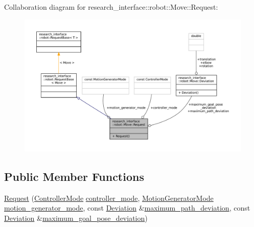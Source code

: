 Collaboration diagram for research\+\_\+interface\+:\+:robot\+:\+:Move\+:\+:Request\+:
\nopagebreak
\begin{figure}[H]
\begin{center}
\leavevmode
\includegraphics[width=350pt]{structresearch__interface_1_1robot_1_1Move_1_1Request__coll__graph}
\end{center}
\end{figure}
\subsection*{Public Member Functions}
\begin{DoxyCompactItemize}
\item 
\hyperlink{structresearch__interface_1_1robot_1_1Move_1_1Request_a763f469d46e3c7b3c74e67995d1974f5}{Request} (\hyperlink{structresearch__interface_1_1robot_1_1Move_a3e7b80b30bbf01dc902c84402502ebbc}{Controller\+Mode} \hyperlink{structresearch__interface_1_1robot_1_1Move_1_1Request_abdc9f396518796f92f722ba1d6d50861}{controller\+\_\+mode}, \hyperlink{structresearch__interface_1_1robot_1_1Move_a334b8380507154e8042b57fbd3287c0f}{Motion\+Generator\+Mode} \hyperlink{structresearch__interface_1_1robot_1_1Move_1_1Request_a550736be5350d0987a133557a8757fd5}{motion\+\_\+generator\+\_\+mode}, const \hyperlink{structresearch__interface_1_1robot_1_1Move_1_1Deviation}{Deviation} \&\hyperlink{structresearch__interface_1_1robot_1_1Move_1_1Request_ace5bcd09768e2cba8ba1e4833d61927d}{maximum\+\_\+path\+\_\+deviation}, const \hyperlink{structresearch__interface_1_1robot_1_1Move_1_1Deviation}{Deviation} \&\hyperlink{structresearch__interface_1_1robot_1_1Move_1_1Request_af2afe598f4dde96a266c56e3cbfc9bd5}{maximum\+\_\+goal\+\_\+pose\+\_\+deviation})
\end{DoxyCompactItemize}
